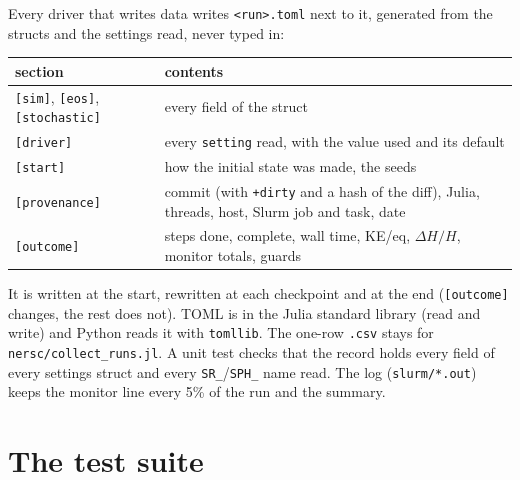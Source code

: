 \documentclass[11pt,aps,preprint,nofootinbib,superscriptaddress,tightenlines]{revtex4-2}
\newcommand{\file}[1]{\texttt{#1}}
\begin{document}
Every driver that writes data writes \file{<run>.toml} next to it, generated from the
structs and the settings read, never typed in:
\begin{center}
\begin{tabular}{lp{}}
\hline
section & contents \\ \hline
\file{[sim]}, \file{[eos]}, \file{[stochastic]} & every field of the struct \\
\file{[driver]} & every \file{setting} read, with the value used and its default \\
\file{[start]} & how the initial state was made, the seeds \\
\file{[provenance]} & commit (with \file{+dirty} and a hash of the diff), Julia, threads, host, Slurm job and task, date \\
\file{[outcome]} & steps done, complete, wall time, KE/eq, $\Delta H/H$, monitor totals, guards \\
\hline
\end{tabular}
\end{center}
It is written at the start, rewritten at each checkpoint and at the end (\file{[outcome]}
changes, the rest does not).  TOML is in the Julia standard library (read and write) and
Python reads it with \file{tomllib}.  The one-row \file{.csv} stays for
\file{nersc/collect\_runs.jl}.  A unit test checks that the record holds every field of every
settings struct and every \file{SR\_}/\file{SPH\_} name read.  The log (\file{slurm/*.out})
keeps the monitor line every 5\% of the run and the summary.

\section{The test suite}
\label{sec:tests}
\end{document}
